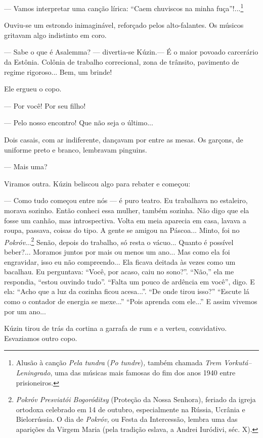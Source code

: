 --- Vamos interpretar uma canção lírica: ``Caem chuviscos na minha
fuça''!...\footnote{Alusão à canção \emph{Pela tundra} (\emph{Po
  tundre})\emph{,} também chamada \emph{Trem Vorkutá--Leningrado}, uma
  das músicas mais famosas do fim dos anos 1940 entre prisioneiros.}

Ouviu-se um estrondo inimaginável, reforçado pelos alto-falantes. Os
músicos gritavam algo indistinto em coro.

--- Sabe o que é Asalemma? --- divertia-se Kúzin.--- É o maior povoado
carcerário da Estônia. Colônia de trabalho correcional, zona de
trânsito, pavimento de regime rigoroso... Bem, um brinde!

Ele ergueu o copo.

--- Por você! Por seu filho!

--- Pelo nosso encontro! Que não seja o último...

Dois casais, com ar indiferente, dançavam por entre as mesas. Os
garçons, de uniforme preto e branco, lembravam pinguins.

--- Mais uma?

Viramos outra. Kúzin beliscou algo para rebater e começou:

--- Como tudo começou entre nós --- é puro teatro. Eu trabalhava no
estaleiro, morava sozinho. Então conheci essa mulher, também sozinha.
Não digo que ela fosse um canhão, mas introspectiva. Volta em meia
aparecia em casa, lavava a roupa, passava, coisas do tipo. A gente se
amigou na Páscoa... Minto, foi no \emph{Pokróv}...\footnote{\emph{Pokróv
  Presviatói Bogoróditsy} (Proteção da Nossa Senhora), feriado da igreja
  ortodoxa celebrado em 14 de outubro, especialmente na Rússia, Ucrânia
  e Bielorrússia. O dia de \emph{Pokróv,} ou Festa da Intercessão,
  lembra uma das aparições da Virgem Maria (pela tradição eslava, a
  Andrei Iuródivi, séc. X).} Senão, depois do trabalho, só resta o
vácuo... Quanto é possível beber?... Moramos juntos por mais ou menos um
ano... Mas como ela foi engravidar, isso eu não compreendo... Ela ficava
deitada às vezes como um bacalhau. Eu perguntava: ``Você, por acaso,
caiu no sono?''. ``Não,'' ela me respondia, ``estou ouvindo tudo''.
``Falta um pouco de ardência em você'', digo. E ela: ``Acho que a luz da
cozinha ficou acesa...''. ``De onde tirou isso?'' ``Escute lá como o
contador de energia se mexe...'' ``Pois aprenda com ele...'' E assim
vivemos por um ano...

Kúzin tirou de trás da cortina a garrafa de rum e a verteu, convidativo.
Esvaziamos outro copo.

